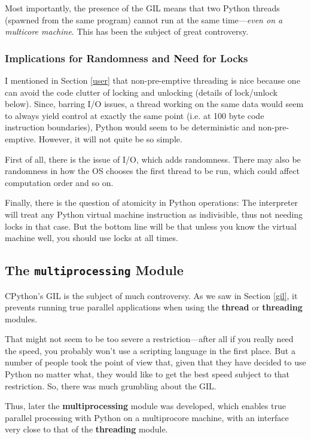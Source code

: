 Most importantly, the presence of the GIL means that two Python threads
(spawned from the same program) cannot run at the same time---{\it even
on a multicore machine}.  This has been the subject of great
controversy.

\subsubsection{Implications for Randomness and Need for Locks}

I mentioned in Section \ref{user} that non-pre-emptive threading is nice
because one can avoid the code clutter of locking and unlocking (details
of lock/unlock below).  Since, barring I/O issues, a thread working on
the same data would seem to always yield control at exactly the same
point (i.e.  at 100 byte code instruction boundaries), Python would seem
to be deterministic and non-pre-emptive.  However, it will not quite be
so simple.  

First of all, there is the issue of I/O, which adds randomness.  There
may also be randomness in how the OS chooses the first thread to be run,
which could affect computation order and so on.

Finally, there is the question of atomicity in Python operations: The
interpreter will treat any Python virtual machine instruction as
indivisible, thus not needing locks in that case.  But the bottom line
will be that unless you know the virtual machine well, you should use
locks at all times.

\subsection{The {\tt multiprocessing} Module}
\label{mpmodule}

CPython's GIL is the subject of much controversy.  As we saw in Section
\ref{gil}, it prevents running true parallel applications when using the
{\bf thread} or {\bf threading} modules.

That might not seem to be too severe a restriction---after all if you
really need the speed, you probably won't use a scripting language in
the first place.  But a number of people took the point of view that,
given that they have decided to use Python no matter what, they would
like to get the best speed subject to that restriction.  So, there was
much grumbling about the GIL.

Thus, later the {\bf multiprocessing} module was developed, which
enables true parallel processing with Python on a multiprocore machine,
with an interface very close to that of the {\bf threading} module.

